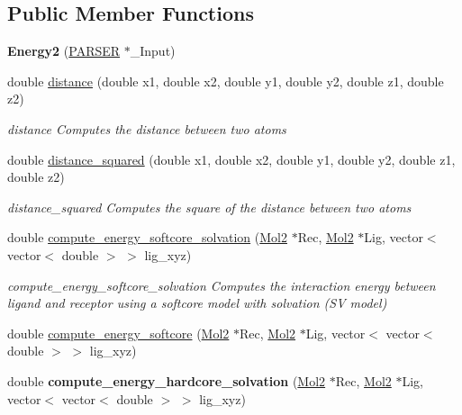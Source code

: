 \subsection*{Public Member Functions}
\begin{DoxyCompactItemize}
\item 
\hypertarget{classEnergy2_af4fe0287b93c3df2d2421dab5b366aad}{
{\bfseries Energy2} (\hyperlink{classPARSER}{PARSER} $\ast$\_\-Input)}
\label{classEnergy2_af4fe0287b93c3df2d2421dab5b366aad}

\item 
double \hyperlink{classEnergy2_a39f28781562359d06bef39ad66f33e85}{distance} (double x1, double x2, double y1, double y2, double z1, double z2)
\begin{DoxyCompactList}\small\item\em distance Computes the distance between two atoms \item\end{DoxyCompactList}\item 
double \hyperlink{classEnergy2_a1711c52d5df4cd462fe5a5bd34c56e46}{distance\_\-squared} (double x1, double x2, double y1, double y2, double z1, double z2)
\begin{DoxyCompactList}\small\item\em distance\_\-squared Computes the square of the distance between two atoms \item\end{DoxyCompactList}\item 
double \hyperlink{classEnergy2_af89f6892acb0a6db0da0b8e941edbed4}{compute\_\-energy\_\-softcore\_\-solvation} (\hyperlink{classMol2}{Mol2} $\ast$Rec, \hyperlink{classMol2}{Mol2} $\ast$Lig, vector$<$ vector$<$ double $>$ $>$ lig\_\-xyz)
\begin{DoxyCompactList}\small\item\em compute\_\-energy\_\-softcore\_\-solvation Computes the interaction energy between ligand and receptor using a softcore model with solvation (SV model) \item\end{DoxyCompactList}\item 
double \hyperlink{classEnergy2_aaac598707f6a3fab0df8d7436b3cdeeb}{compute\_\-energy\_\-softcore} (\hyperlink{classMol2}{Mol2} $\ast$Rec, \hyperlink{classMol2}{Mol2} $\ast$Lig, vector$<$ vector$<$ double $>$ $>$ lig\_\-xyz)
\item 
\hypertarget{classEnergy2_ace8c57a67ba48c2f6e386e6413937112}{
double {\bfseries compute\_\-energy\_\-hardcore\_\-solvation} (\hyperlink{classMol2}{Mol2} $\ast$Rec, \hyperlink{classMol2}{Mol2} $\ast$Lig, vector$<$ vector$<$ double $>$ $>$ lig\_\-xyz)}
\label{classEnergy2_ace8c57a67ba48c2f6e386e6413937112}


\end{DoxyCompactItemize}
